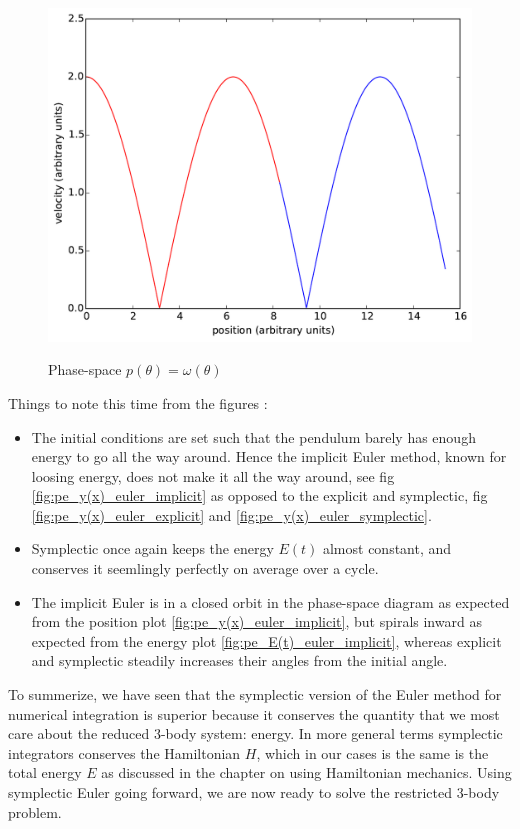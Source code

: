 \begin{figure}
{            \includegraphics[scale=0.24]{fig/pe/pe_phase-space_euler_symplectic.pdf}
            \label{fig:pe_phase-space_euler_symplectic}
        }
        \caption{Phase-space $p(\theta) = \omega(\theta)$}
    \label{fig:pe_phase-space_euler}
\end{figure}
Things to note this time from the figures :
\begin{itemize}
    \item The initial conditions are set such that the pendulum barely has enough energy to go all the way around. Hence the implicit Euler method, known for loosing energy, does not make it all the way around, see fig \ref{fig:pe_y(x)_euler_implicit} as opposed to the explicit and symplectic, fig \ref{fig:pe_y(x)_euler_explicit} and \ref{fig:pe_y(x)_euler_symplectic}.
    \item Symplectic once again keeps the energy $E(t)$ almost constant, and conserves it seemlingly perfectly on average over a cycle.
    \item The implicit Euler is in a closed orbit in the phase-space diagram as expected from the position plot \ref{fig:pe_y(x)_euler_implicit}, but spirals inward as expected from the energy plot \ref{fig:pe_E(t)_euler_implicit}, whereas explicit and symplectic steadily increases their angles from the initial angle.
\end{itemize}
To summerize, we have seen that the symplectic version of the Euler method for numerical integration is superior because it conserves the quantity that we most care about the reduced 3-body system: energy. In more general terms symplectic integrators conserves the Hamiltonian $H$, which in our cases is the same is the total energy $E$ as discussed in the chapter on using Hamiltonian mechanics. Using symplectic Euler going forward, we are now ready to solve the restricted 3-body problem.